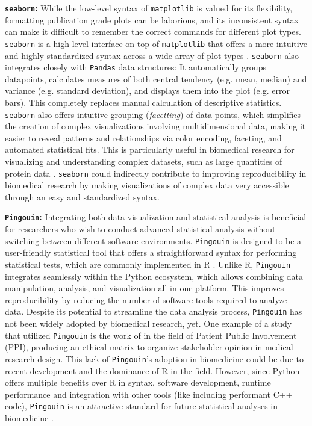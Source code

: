 \textbf{\texttt{seaborn}:} While the low-level syntax of \texttt{matplotlib} is
valued for its flexibility, formatting publication grade plots can be laborious,
and its inconsistent syntax can make it difficult to remember the correct
commands for different plot types. \texttt{seaborn} is a high-level interface on
top of \texttt{matplotlib} that offers a more intuitive and highly standardized
syntax across a wide array of plot types
\cite{waskomSeabornStatisticalData2021}. \texttt{seaborn} also integrates
closely with \texttt{Pandas} data structures: It automatically groups
datapoints, calculates measures of both central tendency (e.g. mean, median) and
variance (e.g. standard deviation), and displays them into the plot (e.g. error
bars). This completely replaces manual calculation of descriptive statistics.
\texttt{seaborn} also offers intuitive grouping (\textit{facetting}) of data
points, which simplifies the creation of complex visualizations involving
multidimensional data, making it easier to reveal patterns and relationships via
color encoding, faceting, and automated statistical fits. This is particularly
useful in biomedical research for visualizing and understanding complex
datasets, such as large quantities of protein data
\cite{krzywinskiMultidimensionalData2013,weissVisualizingProteinBig2022}.
\texttt{seaborn} could indirectly contribute to improving reproducibility in
biomedical research by making visualizations of complex data very accessible
through an easy and standardized syntax.



\textbf{\texttt{Pingouin}:} Integrating both data visualization and statistical
analysis is beneficial for researchers who wish to conduct advanced statistical
analysis without switching between different software environments.
\texttt{Pingouin} is designed to be a user-friendly statistical tool that offers
a straightforward syntax for performing statistical tests, which are commonly
implemented in R \cite{vallatPingouinStatisticsPython2018}. Unlike R,
\texttt{Pingouin} integrates seamlessly within the Python ecosystem, which
allows combining data manipulation, analysis, and visualization all in one
platform. This improves reproducibility by reducing the number of software tools
required to analyze data. Despite its potential to streamline the data analysis
process, \texttt{Pingouin} has not been widely adopted by biomedical research,
yet. One example of a study that utilized \texttt{Pingouin} is the work of
\citet{kellyEthicalMatrixMethod2023} in the field of Patient Public Involvement
(PPI), producing an ethical matrix to organize stakeholder opinion in medical
research design. This lack of \texttt{Pingouin}'s adoption in biomedicine could
be due to recent development and the dominance of R in the field. However, since
Python offers multiple benefits over R in syntax, software development, runtime
performance and integration with other tools (like including performant C++
code), \texttt{Pingouin} is an attractive standard for future statistical
analyses in biomedicine \cite{gorelickHighPerformancePython2020}.



